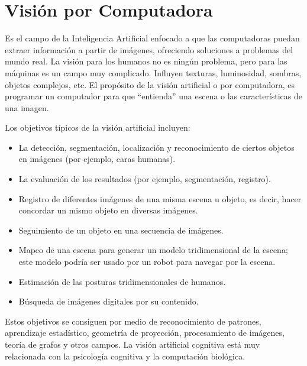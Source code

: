 \section{Visión por Computadora}
Es el campo de la Inteligencia Artificial enfocado a que las computadoras puedan extraer información a partir de imágenes, ofreciendo soluciones a problemas del mundo real. La visión para los humanos no es ningún problema, pero para las máquinas es un campo muy complicado. Influyen texturas, luminosidad, sombras, objetos complejos, etc.
El propósito de la visión artificial o por computadora, es programar un computador para que ``entienda'' una escena o las características de una imagen.

Los objetivos típicos de la visión artificial incluyen:

\begin{itemize}
	\itemsep1pt \parskip1pt 
	\item La detección, segmentación, localización y reconocimiento de ciertos objetos en imágenes (por ejemplo, caras humanas). \item La evaluación de los resultados (por ejemplo, segmentación, registro).
	\item Registro de diferentes imágenes de una misma escena u objeto, es decir, hacer concordar un mismo objeto en diversas imágenes.
	\item Seguimiento de un objeto en una secuencia de imágenes.
	\item Mapeo de una escena para generar un modelo tridimensional de la escena; este modelo podría ser usado por un robot para navegar por la escena.
	\item Estimación de las posturas tridimensionales de humanos.
	\item Búsqueda de imágenes digitales por su contenido.
\end{itemize}

Estos objetivos se consiguen por medio de reconocimiento de patrones, aprendizaje estadístico, geometría de proyección, procesamiento de imágenes, teoría de grafos y otros campos. La visión artificial cognitiva está muy relacionada con la psicología cognitiva y la computación biológica.


